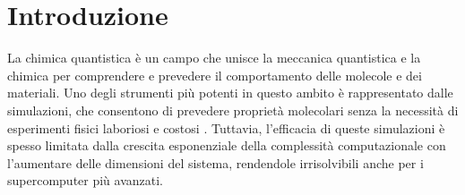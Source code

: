 
\chapter*{Introduzione}

La chimica quantistica è un campo che unisce la meccanica quantistica e la chimica per comprendere e prevedere il comportamento delle molecole e dei materiali. Uno degli strumenti più potenti in questo ambito è rappresentato dalle simulazioni, che consentono di prevedere proprietà molecolari senza la necessità di esperimenti fisici laboriosi e costosi \cite{IBMQuantum}. Tuttavia, l’efficacia di queste simulazioni è spesso limitata dalla crescita esponenziale della complessità computazionale con l’aumentare delle dimensioni del sistema, rendendole irrisolvibili anche per i supercomputer più avanzati.

